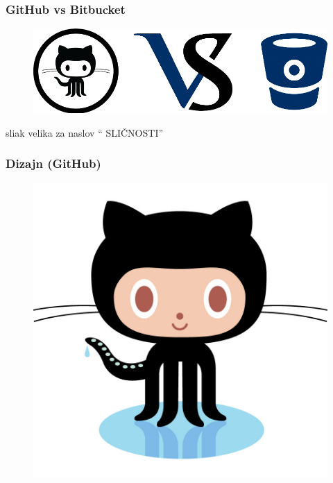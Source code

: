 \documentclass[12p, Times New Roman]{beamer}
\begin{document}
	\begin{frame}    		    %
		\frametitle{GitHub vs Bitbucket}

		 \begin{figure}[h!]
			\begin{center}
				\includegraphics[scale=0.34]{GVB.png}
			\end{center}
		\end{figure}
 


	\end{frame}                             

	\begin{frame}
		sliak velika za naslov `` SLIČNOSTI''

	\end{frame}


	\begin{frame} 			   %
		\frametitle{Dizajn (GitHub)}
		
		\begin{figure}
			\begin{center}
				\includegraphics[scale=0.1]{macka.png}
			\end{center}
		\end{figure}

	\end{frame}                              
\end{document}
